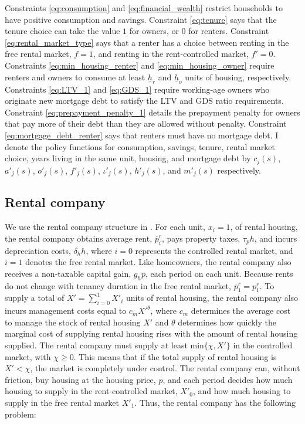 \documentclass[parskip=full]{article}
\begin{document}
Constraints \ref{eq:consumption} and \ref{eq:financial_wealth} restrict households to have positive consumption and savings. Constraint \ref{eq:tenure} says that the tenure choice can take the value $1$ for owners, or $0$ for renters. Constraint \ref{eq:rental_market_type} says that a renter has a choice between renting in the free rental market, $f=1$, and renting in the rent-controlled market, $f'=0$. Constraints \ref{eq:min_housing_renter} and \ref{eq:min_housing_owner} require renters and owners to consume at least $\underline{h}_{r}$ and $\underline{h}_{o}$ units of housing, respectively. Constraints \ref{eq:LTV_1} and \ref{eq:GDS_1} require working-age owners who originate new mortgage debt to satisfy the LTV and GDS ratio requirements. Constraint \ref{eq:prepayment_penalty_1} details the prepayment penalty for owners that pay more of their debt than they are allowed without penalty. Constraint \ref{eq:mortgage_debt_renter} says that renters must have no mortgage debt. I denote the policy functions for consumption, savings, tenure, rental market choice, years living in the same unit, housing, and mortgage debt by $c_{j}(s)$, $a'_{j}(s)$, $o'_{j}(s)$, $f'_{j}(s)$, $\iota'_{j}(s)$, $h'_{j}(s)$, and $m'_{j}(s)$ respectively.

\subsection{Rental company}

We use the rental company structure in \citet{garrigaeetal-2009}. For each unit, $x_{i}=1$, of rental housing, the rental company obtains average rent, $\overline{p}^{r}_{i}$, pays property taxes, $\tau_{p}h$, and incurs depreciation costs, $\delta_{h}h$, where $i=0$ represents the controlled rental market, and $i=1$ denotes the free rental market. Like homeowners, the rental company also receives a non-taxable capital gain, $g_{h}p$, each period on each unit. Because rents do not change with tenancy duration in the free rental market, $\overline{p}^{r}_{1}=p^{r}_{1}$. To supply a total of $X'=\sum^{1}_{i=0} X'_{i}$ units of rental housing, the rental company also incurs management costs equal to $c_{m}X'^{\theta}$, where $c_{m}$ determines the average cost to manage the stock of rental housing $X'$ and $\theta$ determines how quickly the marginal cost of supplying rental housing rises with the amount of rental housing supplied. The rental company must supply at least $\mbox{min}\{\chi,X'\}$ in the controlled market, with $\chi \geq 0$. This means that if the total supply of rental housing is $X'<\chi$, the market is completely under control. The rental company can, without friction, buy housing at the housing price, $p$, and each period decides how much housing to supply in the rent-controlled market, $X'_{0}$, and how much housing to supply in the free rental market $X'_{1}$. Thus, the rental company has the following problem:
\end{document}
